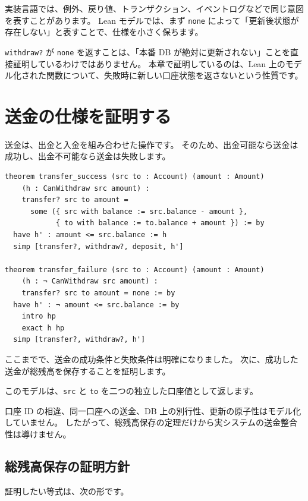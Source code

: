 実装言語では、例外、戻り値、トランザクション、イベントログなどで同じ意図を表すことがあります。
Lean モデルでは、まず \texttt{none} によって「更新後状態が存在しない」と表すことで、仕様を小さく保ちます。

\texttt{withdraw?} が \texttt{none} を返すことは、「本番 DB が絶対に更新されない」ことを直接証明しているわけではありません。
本章で証明しているのは、Lean 上のモデル化された関数について、失敗時に新しい口座状態を返さないという性質です。

\section{送金の仕様を証明する}

送金は、出金と入金を組み合わせた操作です。
そのため、出金可能なら送金は成功し、出金不可能なら送金は失敗します。

\begin{listing}[htbp]
\begin{verbatim}
theorem transfer_success (src to : Account) (amount : Amount)
    (h : CanWithdraw src amount) :
    transfer? src to amount =
      some ({ src with balance := src.balance - amount },
            { to with balance := to.balance + amount }) := by
  have h' : amount <= src.balance := h
  simp [transfer?, withdraw?, deposit, h']

theorem transfer_failure (src to : Account) (amount : Amount)
    (h : ¬ CanWithdraw src amount) :
    transfer? src to amount = none := by
  have h' : ¬ amount <= src.balance := by
    intro hp
    exact h hp
  simp [transfer?, withdraw?, h']
\end{verbatim}
\caption{\texttt{transfer\_success} と \texttt{transfer\_failure}}
\label{lst:ch25-transfer-cases}
\end{listing}

ここまでで、送金の成功条件と失敗条件は明確になりました。
次に、成功した送金が総残高を保存することを証明します。

このモデルは、\texttt{src} と \texttt{to} を二つの独立した口座値として返します。

口座 ID の相違、同一口座への送金、DB 上の別行性、更新の原子性はモデル化していません。
したがって、総残高保存の定理だけから実システムの送金整合性は導けません。

\subsection{総残高保存の証明方針}

証明したい等式は、次の形です。

